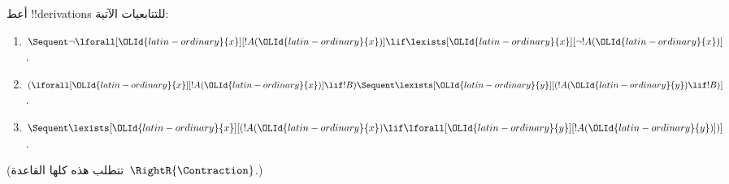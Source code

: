 \documentclass[../../../include/open-logic-section]{subfiles}
\begin{document}
\begin{prob}
أعط !!{derivation}s للتتابعيات الآتية:
\begin{enumerate}
\item $\Sequent \lnot\lforall[{\OLId{latin-ordinary}{x}}][!A({\OLId{latin-ordinary}{x}})] \lif \lexists[{\OLId{latin-ordinary}{x}}][\lnot!A({\OLId{latin-ordinary}{x}})]$.
\item $(\lforall[{\OLId{latin-ordinary}{x}}][!A({\OLId{latin-ordinary}{x}})] \lif !B) \Sequent \lexists[{\OLId{latin-ordinary}{y}}][(!A({\OLId{latin-ordinary}{y}}) \lif !B)]$.
\item $\Sequent \lexists[{\OLId{latin-ordinary}{x}}][(!A({\OLId{latin-ordinary}{x}}) \lif \lforall[{\OLId{latin-ordinary}{y}}][!A({\OLId{latin-ordinary}{y}})])]$.
\end{enumerate}
(تتطلب هذه كلها القاعدة~$\RightR{\Contraction}$.)
\end{prob}
\end{document}
